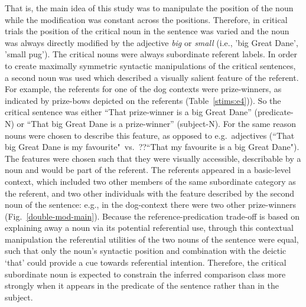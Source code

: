 That is, the main idea of this study was to manipulate the position of the noun while the modification was constant across the positions. Therefore, in critical trials the position of the critical noun in the sentence was varied and the noun was always directly modified by the adjective \textit{big} or \textit{small} (i.e., 'big Great Dane', 'small pug'). The critical nouns were always subordinate referent labels. In order to create maximally symmetric syntactic manipulations of the critical sentences, a second noun was used which described a visually salient feature of the referent. For example, the referents for one of the dog contexts were prize-winners, as indicated by prize-bows depicted on the referents (Table~\ref{stims:e4})). So the critical sentence was either “That prize-winner is a big Great Dane” (predicate-N) or “That big Great Dane is a prize-winner” (subject-N). For the same reason nouns were chosen to describe this feature, as opposed to e.g.~adjectives (``That big Great Dane is my favourite"~vs.~??``That my favourite is a big Great Dane"). The features were chosen such that they were visually accessible, describable by a noun and would be part of the referent.   
The referents appeared in a basic-level context, which included two other members of the same subordinate category as the referent, and two other individuals with the feature described by the second noun of the sentence: e.g., in the dog-context there were two other prize-winners (Fig.~\ref{double-mod-main}). Because the reference-predication trade-off is based on explaining away a noun via its potential referential use, through this contextual manipulation the referential utilities of the two nouns of the sentence were equal, such that only the noun’s syntactic position and combination with the deictic ‘that’ could provide a cue towards referential intention. Therefore, the critical subordinate noun is expected to constrain the inferred comparison class more strongly when it appears in the predicate of the sentence rather than in the subject. 

